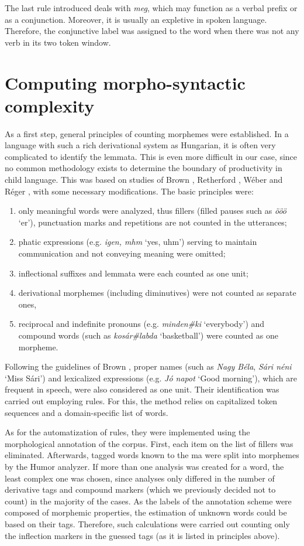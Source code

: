 The last rule introduced deals with \textit{meg}, which may function as a verbal prefix or as a conjunction.  
Moreover, it is usually an expletive in spoken language.
Therefore, the conjunctive label was assigned to the word when there was not any verb in its two token window.

\section{Computing morpho-syntactic complexity}

As a first step, general principles of counting morphemes were established. 
In a language with such a rich derivational system as Hungarian, it is often very complicated to identify the lemmata. 
This is even more difficult in our case, since no common methodology exists to determine the boundary of productivity in child language. 
This was based on studies of Brown \cite{Brown1973}, Retherford \cite{retherford1993guide}, Wéber \cite{Weber2011} and Réger \cite{Reger1990}, with some necessary modifications. 
The basic principles were: 
\begin{enumerate}
 \item only meaningful words were analyzed, thus fillers (filled pauses such as \textit{ööö} `er’), punctuation marks and repetitions are not counted in the utterances;
 \item phatic expressions (e.g. \textit{igen, mhm} `yes, uhm’) serving to maintain communication and not conveying meaning were omitted;
 \item inflectional suffixes and lemmata were each counted as one unit; 
 \item derivational morphemes (including diminutives) were not counted as separate ones,
 \item reciprocal and indefinite pronouns (e.g. \textit{minden\#ki} `everybody’) and compound words (such as \textit{kosár\#labda} `basketball’) were counted as one morpheme.
 \end{enumerate}
 
Following the guidelines of Brown \cite{Brown1973}, proper names (such as \textit{Nagy Béla}, \textit{Sári néni} `Miss Sári’) and lexicalized expressions (e.g. \textit{Jó napot} `Good morning’), which are frequent in speech, were also considered as one unit. 
Their identification was carried out employing rules. 
For this, the method relies on capitalized token sequences and a domain-specific list of words.

As for the automatization of rules, they were implemented using the morphological annotation of the corpus. 
First, each item on the list of fillers was eliminated.
Afterwards, tagged words known to the \acrshort{ma} were split into morphemes by the Humor analyzer. 
If more than one analysis was created for a word, the least complex one was chosen, since analyses only differed in the number of derivative tags and compound markers (which we previously decided not to count) in the majority of the cases.
As the labels of the annotation scheme were composed of morphemic properties, the estimation of unknown words could be based on their tags. 
Therefore, such calculations were carried out counting only the inflection markers in the guessed tags (as it is listed in principles above). 

